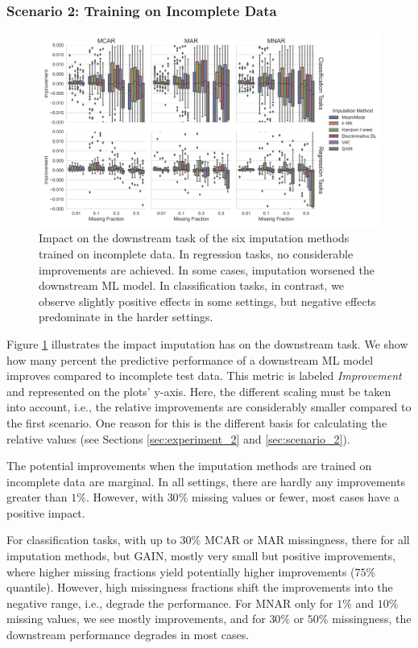 \documentclass[utf8]{frontiersSCNS} %
\begin{document}
\subsubsection{Scenario 2: Training on Incomplete Data}

\begin{figure}\centering
	\includegraphics[width=1\columnwidth]{corrupted_downstream_boxplot}

	\caption{Impact on the downstream task of the six imputation methods trained on incomplete data. In regression tasks, no considerable improvements are achieved. In some cases, imputation worsened the downstream ML model. In classification tasks, in contrast, we observe slightly positive effects in some settings, but negative effects predominate in the harder settings.
	}
	\label{fig:corrupted_downstream_boxplot}
\end{figure}


Figure \ref{fig:corrupted_downstream_boxplot} illustrates the impact imputation has on the downstream task. We show how many percent the predictive performance of a downstream ML model improves compared to incomplete test data. This metric is labeled \textit{Improvement} and represented on the plots' y-axis. Here, the different scaling must be taken into account, i.e., the relative improvements are considerably smaller compared to the first scenario. One reason for this is the different basis for calculating the relative values (see Sections \ref{sec:experiment_2} and \ref{sec:scenario_2}).

The potential improvements when the imputation methods are trained on incomplete data are marginal. In all settings, there are hardly any improvements greater than $1\%$. However, with $30\%$ missing values or fewer, most cases have a positive impact.

For classification tasks, with up to $30\%$ MCAR or MAR missingness, there for all imputation methods, but GAIN, mostly very small but positive improvements, where higher missing fractions yield potentially higher improvements ($75\%$ quantile). However, high missingness fractions shift the improvements into the negative range, i.e., degrade the performance. For MNAR only for $1\%$ and $10\%$ missing values, we see mostly improvements, and for $30\%$ or $50\%$ missingness, the downstream performance degrades in most cases.
\end{document}

